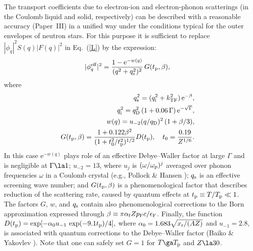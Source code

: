 \documentclass{aa}
\newcommand{\beq}{\begin{equation}}
\newcommand{\eeq}{\end{equation}}
\newcommand{\req}[1]{Eq.~(\ref{#1})}
\newcommand{\xr}{x_{\rm r}}
\begin{document}
The transport coefficients due to electron-ion and electron-phonon
scatterings (in the Coulomb liquid and solid, respectively)
can be described with a reasonable accuracy (Paper~III) in a unified way
under the conditions typical for the outer envelopes of neutron stars.
For this purpose it is sufficient to replace
$|\phi_q|^2 S(q) |F(q)|^2$ in \req{L} by
the expression:
\beq
   |\phi_q^{\rm eff}|^2 = {  1- \mathrm{e}^{-w(q)}
        \over (q^2 + q_{\rm s}^2)^2 }
       \, G(t_{\rm p},\beta),
\label{Ufit}
\eeq
where
\begin{eqnarray}
&&\hspace*{-.9em}
     q_{\rm s}^2 = (q_{\rm i}^2 + k_{\rm TF}^2)\,\mathrm{e}^{-\beta},
\label{qs2}
\\&&\hspace*{-.9em}
     q_{\rm i}^2 =
     q_{\rm D}^2\,(1+0.06\,\Gamma) \, \mathrm{e}^{-\sqrt\Gamma},
\label{qi}
\\&&\hspace*{-.9em}
    w(q) = u_{-2} (q / q_{\rm D})^2 \,(1+\beta/3),
\\&&\hspace*{-.9em}
    G(t_{\rm p},\beta) =
  {1+0.122\beta^2\over (1 + t_0^2/t_{\rm p}^2)^{1/2} } D(t_{\rm p}),
\quad
    t_0 = {0.19 \over Z^{1/6}}.
\label{Deta}
\end{eqnarray}
%
In this case $\mathrm{e}^{-w(q)}$
plays role of an effective Debye--Waller factor
at large $\Gamma$ and is negligible at $\Gamma \la 1$;
$u_{-2}=13$, where $u_j$ is $(\omega/\omega_{\rm p})^j$
averaged over phonon frequencies
$\omega$ in a Coulomb crystal (e.g., Pollock \& Hansen \cite{ph73});
$q_{\rm s}$ is an effective screening wave number;
and $G(t_{\rm p},\beta)$
is a phenomenological factor that describes
reduction of the scattering rate, caused by quantum effects
at $t_{\rm p}\equiv T/T_{\rm p}\ll1$.
The factors $G$, $w$, and $q_{\rm s}$ contain also
phenomenological corrections to the Born approximation
expressed through
$\beta \equiv \pi\alpha_{\rm f} Z p_{\rm F}c/\epsilon_{\rm F}$.
Finally, the function
$
D(t_{\rm p}) = \exp[ - \alpha_0 u_{-1} \,
                         \exp(-9.1 t_{\rm p})/4],
$
where
$
\alpha_0 = 1.683 \sqrt{\xr /  (A Z)}
$
and $u_{-1}=2.8$,
is associated with quantum corrections
to the Debye--Waller factor
(Baiko \& Yakovlev \cite{bya95}).
Note that one can safely set
$G = 1$ for $T\ga T_{\rm p}$ and $Z\la 30$.

\end{document}
